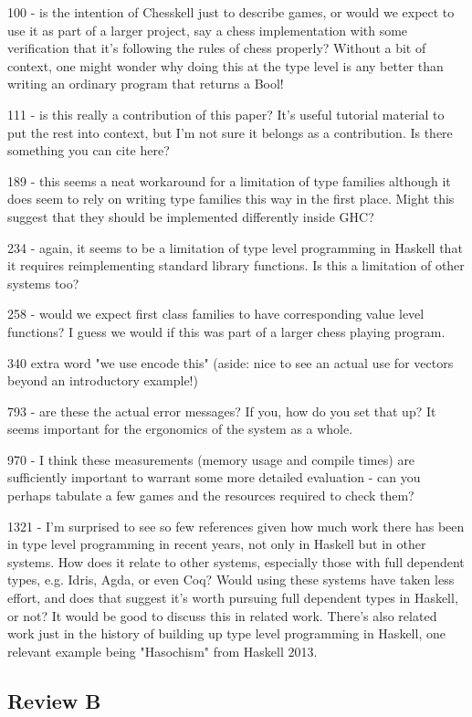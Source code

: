 100 - is the intention of Chesskell just to describe games, or would we expect to use it as part of a larger project, say a chess implementation with some verification that it's following the rules of chess properly? Without a bit of context, one might wonder why doing this at the type level is any better than writing an ordinary program that returns a Bool!

111 - is this really a contribution of this paper? It's useful tutorial material to put the rest into context, but I'm not sure it belongs as a contribution. Is there something you can cite here?

189 - this seems a neat workaround for a limitation of type families although it does seem to rely on writing type families this way in the first place. Might this suggest that they should be implemented differently inside GHC?

234 - again, it seems to be a limitation of type level programming in Haskell that it requires reimplementing standard library functions. Is this a limitation of other systems too?

258 - would we expect first class families to have corresponding value level functions? I guess we would if this was part of a larger chess playing program.

340 extra word "we use encode this" (aside: nice to see an actual use for vectors beyond an introductory example!)

793 - are these the actual error messages? If you, how do you set that up? It seems important for the ergonomics of the system as a whole.

970 - I think these measurements (memory usage and compile times) are sufficiently important to warrant some more detailed evaluation - can you perhaps tabulate a few games and the resources required to check them?

1321 - I'm surprised to see so few references given how much work there has been in type level programming in recent years, not only in Haskell but in other systems. How does it relate to other systems, especially those with full dependent types, e.g. Idris, Agda, or even Coq? Would using these systems have taken less effort, and does that suggest it's worth pursuing full dependent types in Haskell, or not? It would be good to discuss this in related work. There's also related work just in the history of building up type level programming in Haskell, one relevant example being "Hasochism" from Haskell 2013.

\subsection{Review B}

